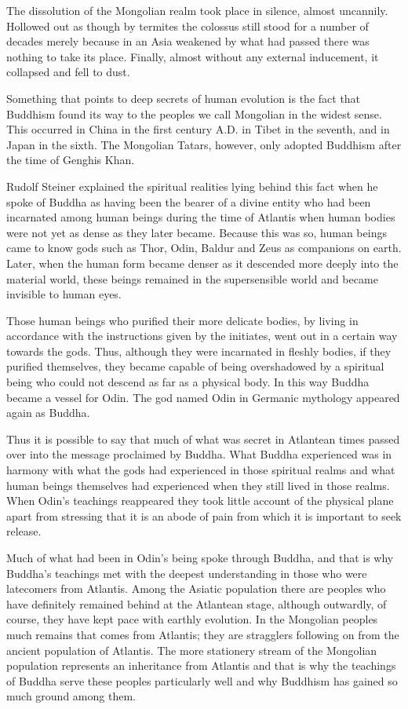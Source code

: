 The dissolution of the Mongolian realm took place in silence, almost uncannily. Hollowed out as though by termites the colossus still stood for a number of decades merely because in an Asia weakened by what had passed there was nothing to take its place. Finally, almost without any external inducement, it collapsed and fell to dust.

Something that points to deep secrets of human evolution is the fact that Buddhism found its way to the peoples we call Mongolian in the widest sense. This occurred in China in the first century A.D. in Tibet in the seventh, and in Japan in the sixth. The Mongolian Tatars, however, only adopted Buddhism after the time of Genghis Khan.

Rudolf Steiner explained the spiritual realities lying behind this fact when he spoke of Buddha as having been the bearer of a divine entity who had been incarnated among human beings during the time of Atlantis when human bodies were not yet as dense as they later became. Because this was so, human beings came to know gods such as Thor, Odin, Baldur and Zeus as companions on earth. Later, when the human form became denser as it descended more deeply into the material world, these beings remained in the supersensible world and became invisible to human eyes.

\begin{quotationx}
Those human beings who purified their more delicate bodies, by living in accordance with the instructions given by the initiates, went out in a certain way towards the gods. Thus, although they were incarnated in fleshly bodies, if they purified themselves, they became capable of being overshadowed by a spiritual being who could not descend as far as a physical body. In this way Buddha became a vessel for Odin. The god named Odin in Germanic mythology appeared again as Buddha.

Thus it is possible to say that much of what was secret in Atlantean times passed over into the message proclaimed by Buddha. What Buddha experienced was in harmony with what the gods had experienced in those spiritual realms and what human beings themselves had experienced when they still lived in those realms. When Odin's teachings reappeared they took little account of the physical plane apart from stressing that it is an abode of pain from which it is important to seek release.

Much of what had been in Odin's being spoke through Buddha, and that is why Buddha's teachings met with the deepest understanding in those who were latecomers from Atlantis. Among the Asiatic population there are peoples who have definitely remained behind at the Atlantean stage, although outwardly, of course, they have kept pace with earthly evolution. In the Mongolian peoples much remains that comes from Atlantis; they are stragglers following on from the ancient population of Atlantis. The more stationery stream of the Mongolian population represents an inheritance from Atlantis and that is why the teachings of Buddha serve these peoples particularly well and why Buddhism has gained so much ground among them. 
\end{quotationx}

